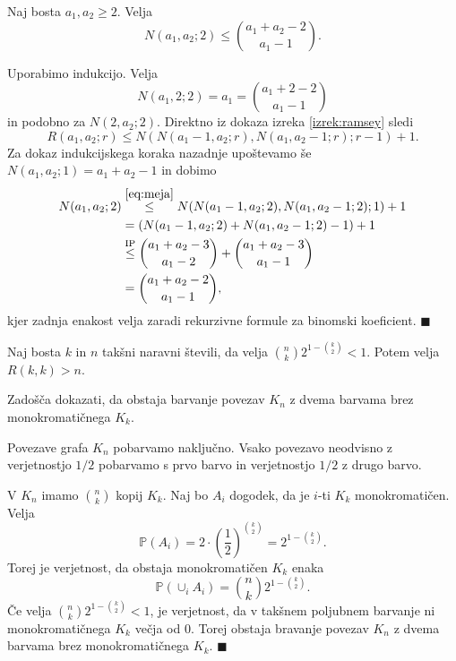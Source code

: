 \documentclass[twoside,11pt]{article}
\begin{document}
\begin{trditev}
    Naj bosta $a_1,a_2 \ge 2$. Velja
    \[
        N(a_1, a_2; 2) \le \binom{a_1 + a_2 -2}{a_1-1}.
    \]
\end{trditev}

\begin{dokaz}
    Uporabimo indukcijo. Velja
    \[
        N(a_1, 2; 2) = a_1 = \binom{a_1+2-2}{a_1-1}
    \]
    in podobno za $N(2,a_2; 2)$. Direktno iz dokaza 
    izreka \ref{izrek:ramsey} sledi
    \begin{equation}
        R(a_1, a_2; r) \le N(N(a_1-1,a_2;r), N(a_1,a_2-1;r);r-1) + 1.
        \label{eq:meja}
    \end{equation}
    Za dokaz indukcijskega koraka nazadnje upoštevamo še $N(a_1,a_2;1) = a_1 + a_2 - 1$ in dobimo
    \begin{align*}
        N(a_1, a_2; 2) &\overset{\eqref{eq:meja}}{\le} N(N(a_1-1,a_2;2), N(a_1,a_2-1;2);1) +1\\
        &= (N(a_1-1,a_2;2) + N(a_1,a_2-1; 2) - 1) + 1 \\
        &\overset{{\text{IP}}}{\le} \binom{a_1 + a_2 -3}{a_1-2} + \binom{a_1 + a_2 -3}{a_1-1} \\
        &=\binom{a_1+a_2-2}{a_1-1},
    \end{align*}
    kjer zadnja enakost velja zaradi rekurzivne formule za binomski koeficient. \hfill $\blacksquare$
\end{dokaz} 

\begin{izrek}
    Naj bosta $k$ in $n$ takšni naravni števili, da velja 
    $\binom{n}{k}2^{1-\binom{k}{2}} < 1$. Potem velja 
    $R(k,k) > n$.
\end{izrek}

\begin{dokaz}
    Zadošča dokazati, da obstaja barvanje povezav $K_n$ z dvema barvama
    brez monokromatičnega $K_k$.

    Povezave grafa $K_n$ pobarvamo naključno. Vsako povezavo 
    neodvisno z verjetnostjo $1/2$ pobarvamo s prvo barvo in 
    verjetnostjo $1/2$ z drugo barvo.
    
    V $K_n$ imamo $\binom{n}{k}$ kopij $K_k$. Naj bo $A_i$ dogodek, da 
    je $i$-ti $K_k$ monokromatičen. Velja
    \[
        \mathbb{P}(A_i) = 2 \cdot \left(\frac{1}{2}\right)^{\binom{k}{2}} = 
        2^{1-\binom{k}{2}}.
    \]
    Torej je verjetnost, da obstaja monokromatičen $K_k$ enaka 
    \[
        \mathbb{P}\left(\cup_iA_i\right) = \binom{n}{k}2^{1-\binom{k}{2}}.
    \]
    Če velja $\binom{n}{k}2^{1-\binom{k}{2}} < 1$, je verjetnost, da v 
    takšnem poljubnem barvanje ni monokromatičnega $K_k$ večja od $0$.
    Torej obstaja bravanje povezav $K_n$ z dvema barvama brez 
    monokromatičnega $K_k$. \hfill $\blacksquare$
\end{dokaz}
\end{document}

